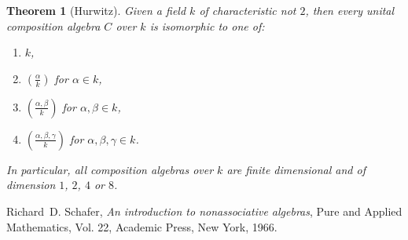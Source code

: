 \documentclass[12pt]{article}
\newcommand{\CayDick}[2]{\left(\frac{#1}{#2}\right)}
\newtheorem{thm}{Theorem}
\begin{document}
\begin{thm}[Hurwitz]\label{thm:Hurwitz}\cite[Theorem 3.25]{Schafer:nonass}
Given a field $k$ of characteristic not $2$, then every unital composition algebra $C$ 
over $k$ is isomorphic to one of:
\begin{enumerate}
\item $k$,
\item $\CayDick{\alpha}{k}$ for $\alpha\in k$,
\item $\CayDick{\alpha,\beta}{k}$ for $\alpha,\beta\in k$,
\item $\CayDick{\alpha,\beta,\gamma}{k}$ for $\alpha,\beta,\gamma\in k$.
\end{enumerate}
In particular, all composition algebras over $k$ are finite dimensional and of dimension
$1$, $2$, $4$ or $8$.
\end{thm}


\begin{thebibliography}{7}
Richard~D. Schafer, \emph{An introduction to nonassociative algebras}, Pure and
  Applied Mathematics, Vol. 22, Academic Press, New York, 1966. 
\end{thebibliography}

\end{document}
